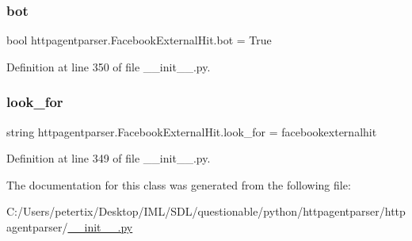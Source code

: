 \subsubsection{\texorpdfstring{bot}{bot}}
{\footnotesize\ttfamily bool httpagentparser.\+Facebook\+External\+Hit.\+bot = True\hspace{0.3cm}{\ttfamily [static]}}



Definition at line 350 of file \+\_\+\+\_\+init\+\_\+\+\_\+.\+py.

\hypertarget{classhttpagentparser_1_1_facebook_external_hit_af5e02b266f88584a7e54f7984a987a6d}{}\label{classhttpagentparser_1_1_facebook_external_hit_af5e02b266f88584a7e54f7984a987a6d} 
\subsubsection{\texorpdfstring{look\+\_\+for}{look\_for}}
{\footnotesize\ttfamily string httpagentparser.\+Facebook\+External\+Hit.\+look\+\_\+for = \textquotesingle{}facebookexternalhit\textquotesingle{}\hspace{0.3cm}{\ttfamily [static]}}



Definition at line 349 of file \+\_\+\+\_\+init\+\_\+\+\_\+.\+py.



The documentation for this class was generated from the following file\+:\begin{DoxyCompactItemize}
\item 
C\+:/\+Users/petertix/\+Desktop/\+I\+M\+L/\+S\+D\+L/questionable/python/httpagentparser/httpagentparser/\hyperlink{____init_____8py}{\+\_\+\+\_\+init\+\_\+\+\_\+.\+py}\end{DoxyCompactItemize}
